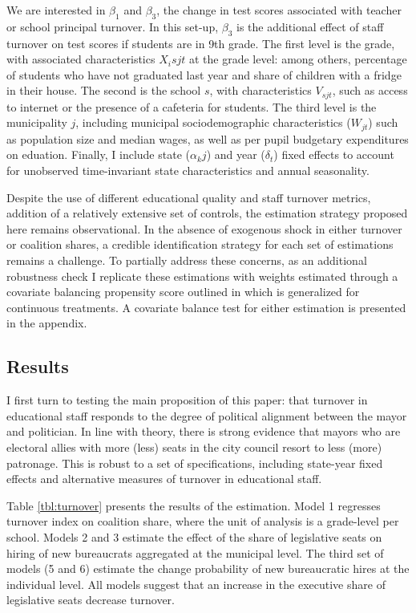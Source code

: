 \documentclass[12pt,a4paper]{article}
\begin{document}
We are interested in $\beta_1$ and $\beta_3$, the change in test scores associated with teacher or school principal turnover. In this set-up, $\beta_3$ is the additional effect of staff turnover on test scores if students are in 9th grade. The first level is the grade, with associated characteristics $X_isjt$ at the grade level: among others, percentage of students who have not graduated last year and share of children with a fridge in their house. The second is the school $s$, with characteristics $V_{sjt}$, such as access to internet or the presence of a cafeteria for students. The third level is the municipality $j$, including municipal sociodemographic characteristics ($W_{jt}$) such as population size and median wages, as well as per pupil budgetary expenditures on eduation. Finally, I include state ($\alpha_kj$) and year ($\delta_t$) fixed effects to account for unobserved time-invariant state characteristics and annual seasonality.

Despite the use of different educational quality and staff turnover metrics, addition of a relatively extensive set of controls, the estimation strategy proposed here remains observational. In the absence of exogenous shock in either turnover or coalition shares, a credible identification strategy for each set of estimations remains a challenge. To partially address these concerns, as an additional robustness check I replicate these estimations with weights estimated through a covariate balancing propensity score outlined in \citet{imai_covariate_2014} which is generalized for continuous treatments. A covariate balance test for either estimation is presented in the appendix.

\subsection*{Results}

I first turn to testing the main proposition of this paper: that turnover in educational staff responds to the degree of political alignment between the mayor and politician. In line with theory, there is strong evidence that mayors who are electoral allies with more (less) seats in the city council resort to less (more) patronage. This is robust to a set of specifications, including state-year fixed effects and alternative measures of turnover in educational staff. 

Table \ref{tbl:turnover} presents the results of the estimation. Model 1 regresses turnover index on coalition share, where the unit of analysis is a grade-level per school. Models 2 and 3 estimate the effect of the share of legislative seats on hiring of new bureaucrats aggregated at the municipal level. The third set of models (5 and 6) estimate the change probability of new bureaucratic hires at the individual level. All models suggest that an increase in the executive share of legislative seats decrease turnover.
\end{document}
